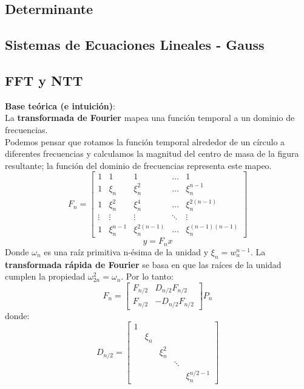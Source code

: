 {\subsection{Determinante}
\subsection{Sistemas de Ecuaciones Lineales - Gauss}

\subsection{FFT y NTT}
\textbf{Base teórica (e intuición)}: \\
La \textbf{transformada de Fourier} mapea una función temporal a un dominio de frecuencias. \\
Podemos pensar que rotamos la función temporal alrededor de un círculo a diferentes frecuencias y
calculamos la magnitud del centro de masa de la figura resultante; la función del dominio de 
frecuencias representa este mapeo. \\
\[
    F_n = 
    \begin{bmatrix}
        1 & 1 & 1 & \ldots & 1 \\
        1 & \xi_n & \xi_n^2 & \dots & \xi_n^{n-1} \\
        1 & \xi_n^2 & \xi_n^4 & \dots & \xi_n^{2(n-1)} \\
        \vdots & \vdots & \vdots & \ddots & \vdots \\
        1 & \xi_n^{n-1} & \xi_n^{2(n-1)} & \dots & \xi_n^{(n-1)(n-1)}
    \end{bmatrix}
\]
\[
    y = F_nx
\]
Donde $\omega_n$ es una raíz primitiva n-ésima de la unidad y $\xi_n = w_n^{n-1}$.
La \textbf{transformada rápida de Fourier} se basa en que las raíces de la unidad cumplen la propiedad $ \omega_{2n}^{2} = \omega_{n} $. Por lo tanto:
\[
    F_n = 
    \begin{bmatrix}
        F_{n/2} & D_{n/2}F_{n/2} \\
        F_{n/2} & -D_{n/2}F_{n/2}
    \end{bmatrix}
    P_n 
\]
donde: 
\[
    D_{n/2} = 
    \begin{bmatrix}
        1 \\
        & \xi_n \\
        & & \xi_n^2 \\
        & & & \ddots \\
        & & & & \xi_n^{n/2-1}
    \end{bmatrix}
\]}
